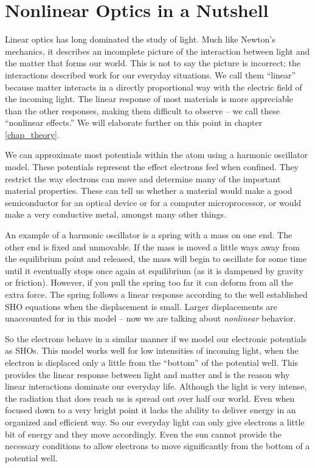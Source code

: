 \section{Nonlinear Optics in a Nutshell}\label{chap_intro_nonlin}
Linear optics has long dominated the study of light. Much like Newton's mechanics, it describes an incomplete picture of the interaction between light and the matter that forms our world. This is not to say the picture is incorrect; the interactions described work for our everyday situations. We call them ``linear'' because matter interacts in a directly proportional way with the electric field of the incoming light. The linear response of most materials is more appreciable than the other responses, making them difficult to observe -- we call these ``nonlinear effects.'' We will elaborate further on this point in chapter \ref{chap_theory}.

We can approximate most potentials within the atom using a harmonic oscillator model. These potentials represent the effect electrons feel when confined. They restrict the way electrons can move and determine many of the important material properties. These can tell us whether a material would make a good semiconductor for an optical device or for a computer microprocessor, or would make a very conductive metal, amongst many other things.

An example of a harmonic oscillator is a spring with a mass on one end. The other end is fixed and unmovable. If the mass is moved a little ways away from the equilibrium point and released, the mass will begin to oscillate for some time until it eventually stops once again at equilibrium (as it is dampened by gravity or friction). However, if you pull the spring too far it can deform from all the extra force. The spring follows a linear response according to the well established SHO equations when the displacement is small. Larger displacements are unaccounted for in this model -- now we are talking about \emph{nonlinear} behavior.

So the electrons behave in a similar manner if we model our electronic potentials as SHOs. This model works well for low intensities of incoming light, when the electron is displaced only a little from the ``bottom'' of the potential well. This provides the linear response between light and matter and is the reason why linear interactions dominate our everyday life. Although the light is very intense, the radiation that does reach us is spread out over half our world. Even when focused down to a very bright point it lacks the ability to deliver energy in an organized and efficient way. So our everyday light can only give electrons a little bit of energy and they move accordingly. Even the sun cannot provide the necessary conditions to allow electrons to move significantly from the bottom of a potential well.

